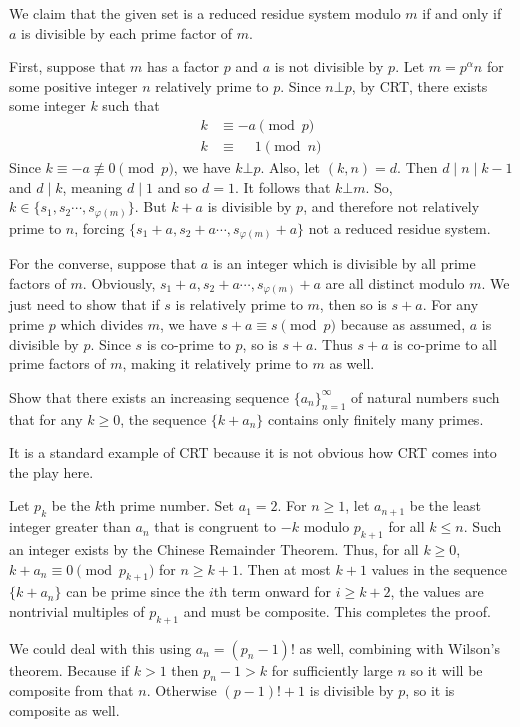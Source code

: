 \documentclass{subfile}
\begin{document}
		\begin{solution}
			We claim that the given set is a reduced residue system modulo $m$ if and only if $a$ is divisible by each prime factor of $m$.

			First, suppose that $m$ has a factor $p$ and $a$ is not divisible by $p$. Let $m=p^{\alpha}n$ for some positive integer $n$ relatively prime to $p$. Since $n \bot p$, by CRT, there exists some integer $k$ such that
				\begin{align*}
					k &\equiv -a \pmod p\\
					k &\equiv \phantom{-}1  \pmod n
				\end{align*}
			Since $k \equiv -a \not \equiv 0 \pmod p$, we have $k \bot p$. Also, let $(k,n)=d$. Then $d\mid n\mid k-1$ and $d\mid k$, meaning $d\mid 1$ and so $d=1$. It follows that $k \bot m$. So, $k \in \{s_1,s_2\cdots , s_{\varphi(m)}\} $. But $k+a$ is divisible by $p$, and therefore not relatively prime to $n$, forcing $ \{s_1+a,s_2+a\cdots , s_{\varphi(m)}+a\} $ not a reduced residue system.

			For the converse, suppose that $a$ is an integer which is divisible by all prime factors of $m$. Obviously, $s_1+a,s_2+a\cdots , s_{\varphi(m)}+a$ are all distinct modulo $m$. We just need to show that if $s$ is relatively prime to $m$, then so is $s+a$. For any prime $p$ which divides $m$, we have $s+a \equiv s \pmod p$ because as assumed, $a$ is divisible by $p$. Since $s$ is co-prime to $p$, so is $s+a$. Thus $s+a$ is co-prime to all prime factors of $m$, making it relatively prime to $m$ as well.
		\end{solution}

		\begin{problem}
			Show that there exists an increasing sequence $\{a_{n}\}_{n=1}^{\infty}$ of natural numbers such that for any $k \geq  0$, the sequence $\{k+a_{n}\}$ contains only finitely many primes.
		\end{problem}
	It is a standard example of CRT because it is not obvious how CRT comes into the play here.
		\begin{solution}
			Let $p_{k}$ be the $k$th prime number. Set ${a_1}= 2$. For	$n \geq  1$, let $a_{n+1}$ be the least integer greater than $a_{n}$ that is congruent to $-k$ modulo $p_{k+1}$ for all $k \leq  n$. Such an integer exists by the Chinese Remainder
			Theorem. Thus, for all $k \geq 0$, $k+a_{n}\equiv 0\pmod{p_{k+1}}$ for $n \geq  k + 1$. Then at most $k+1$ values in the sequence $\{k+a_{n}\}$ can be prime since the $i$th term onward for $i\geq k+2$, the values are nontrivial multiples of $p_{k+1}$ and must be composite. This completes the proof.
		\end{solution}

	\begin{note}
		We could deal with this using $a_n=(p_n-1)!$ as well, combining with Wilson's theorem. Because if $k>1$ then $p_n-1>k$ for sufficiently large $n$ so it will be composite from that $n$. Otherwise $(p-1)!+1$ is divisible by $p$, so it is composite as well.
	\end{note}
\end{document}
